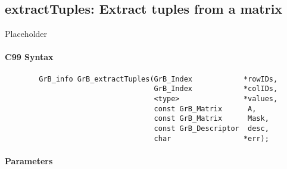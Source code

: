 
\subsection{{\sf extractTuples}: Extract tuples from a matrix}
\label{Sec:extractTuples}

Placeholder


\paragraph{C99 Syntax}

\begin{verbatim}
        GrB_info GrB_extractTuples(GrB_Index            *rowIDs,
                                   GrB_Index            *colIDs,
                                   <type>               *values, 
                                   const GrB_Matrix      A,
                                   const GrB_Matrix      Mask,
                                   const GrB_Descriptor  desc,
                                   char                 *err);
\end{verbatim}

\paragraph{Parameters}

